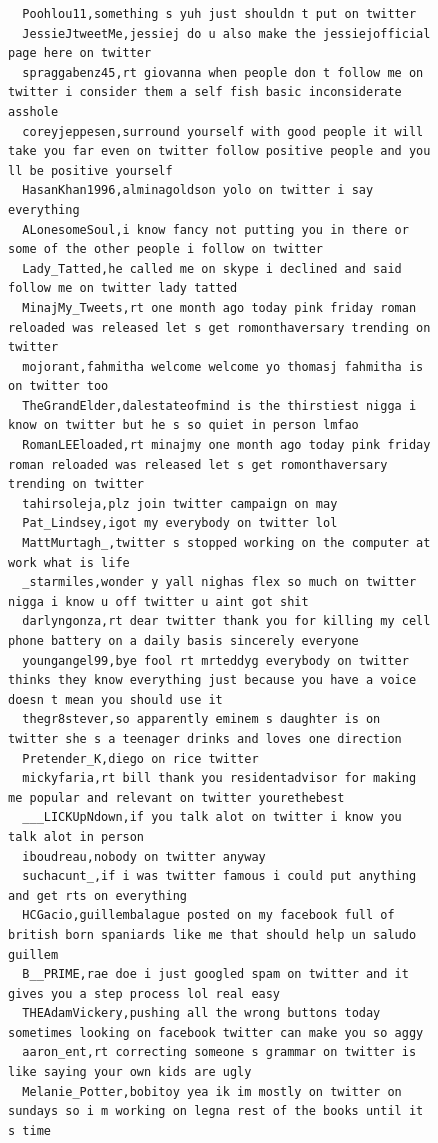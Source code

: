 \begin{figure}[htpb]
\begin{verbatim}
  Poohlou11,something s yuh just shouldn t put on twitter
  JessieJtweetMe,jessiej do u also make the jessiejofficial page here on twitter
  spraggabenz45,rt giovanna when people don t follow me on twitter i consider them a self fish basic inconsiderate asshole
  coreyjeppesen,surround yourself with good people it will take you far even on twitter follow positive people and you ll be positive yourself
  HasanKhan1996,alminagoldson yolo on twitter i say everything
  ALonesomeSoul,i know fancy not putting you in there or some of the other people i follow on twitter
  Lady_Tatted,he called me on skype i declined and said follow me on twitter lady tatted
  MinajMy_Tweets,rt one month ago today pink friday roman reloaded was released let s get romonthaversary trending on twitter
  mojorant,fahmitha welcome welcome yo thomasj fahmitha is on twitter too
  TheGrandElder,dalestateofmind is the thirstiest nigga i know on twitter but he s so quiet in person lmfao
  RomanLEEloaded,rt minajmy one month ago today pink friday roman reloaded was released let s get romonthaversary trending on twitter
  tahirsoleja,plz join twitter campaign on may
  Pat_Lindsey,igot my everybody on twitter lol
  MattMurtagh_,twitter s stopped working on the computer at work what is life
  _starmiles,wonder y yall nighas flex so much on twitter nigga i know u off twitter u aint got shit
  darlyngonza,rt dear twitter thank you for killing my cell phone battery on a daily basis sincerely everyone
  youngangel99,bye fool rt mrteddyg everybody on twitter thinks they know everything just because you have a voice doesn t mean you should use it
  thegr8stever,so apparently eminem s daughter is on twitter she s a teenager drinks and loves one direction
  Pretender_K,diego on rice twitter
  mickyfaria,rt bill thank you residentadvisor for making me popular and relevant on twitter yourethebest
  ___LICKUpNdown,if you talk alot on twitter i know you talk alot in person
  iboudreau,nobody on twitter anyway
  suchacunt_,if i was twitter famous i could put anything and get rts on everything
  HCGacio,guillembalague posted on my facebook full of british born spaniards like me that should help un saludo guillem
  B__PRIME,rae doe i just googled spam on twitter and it gives you a step process lol real easy
  THEAdamVickery,pushing all the wrong buttons today sometimes looking on facebook twitter can make you so aggy
  aaron_ent,rt correcting someone s grammar on twitter is like saying your own kids are ugly
  Melanie_Potter,bobitoy yea ik im mostly on twitter on sundays so i m working on legna rest of the books until it s time

\end{verbatim}
\end{figure}
